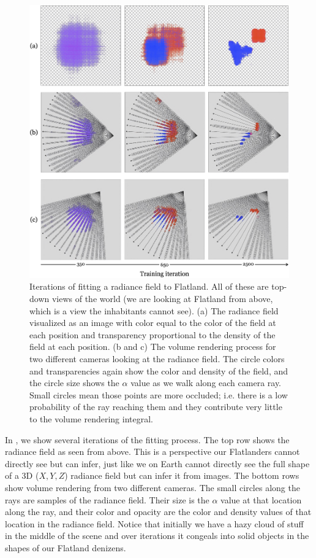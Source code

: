 \begin{figure}[t]
    \centerline{
        \includegraphics[width=.9\linewidth]{figures/nerfs/flatland_training.jpg}
    }
    \caption{Iterations of fitting a radiance field to Flatland. All of these are top-down views of the world (we are looking at Flatland from above, which is a view the inhabitants cannot see). (a) The radiance field visualized as an image with color equal to the color of the field at each position and transparency proportional to the density of the field at each position. (b and c) The volume rendering process for two different cameras looking at the radiance field. The circle colors and transparencies again show the color and density of the field, and the circle size shows the $\alpha$ value as we walk along each camera ray. Small circles mean those points are more occluded; i.e. there is a low probability of the ray reaching them and they contribute very little to the volume rendering integral.}
    \label{fig:nerfs:flatland_training}
\end{figure}

In \fig{\ref{fig:nerfs:flatland_training}}, we show several iterations of the fitting process. The top row shows the radiance field as seen from above.
This is a perspective our Flatlanders cannot directly see but can infer, just like we on Earth cannot directly see the full shape of a 3D ($X,Y,Z$)
radiance field but can infer it from images. The bottom rows show volume rendering from two different cameras. The small circles along the rays are samples of the radiance field.
Their size is the $\alpha$ value at that location along the ray, and their color and opacity are the color and density values of that location in the radiance field.
Notice that initially we have a hazy cloud of stuff in the middle of the scene and over iterations it congeals into solid objects in the shapes of our Flatland denizens.


